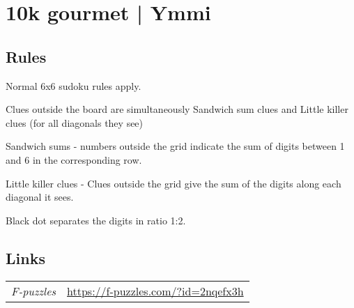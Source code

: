 \section{10k gourmet | {\normalfont Ymmi}}
\label{sec:06-10k-gourmet-ymmi}

\subsection*{Rules}
\begin{markdown}
Normal 6x6 sudoku rules apply. 

Clues outside the board are simultaneously Sandwich sum clues and Little killer clues (for all diagonals they see) 

Sandwich sums - numbers outside the grid indicate the sum of digits between 1 and 6 in the corresponding row\column.

Little killer clues - Clues outside the grid give the sum of the digits along each diagonal it sees. 

Black dot separates the digits in ratio 1:2.
\end{markdown}
\subsection*{Links}
\begin{tabularx}{\textwidth}{l X}
\emph{F-puzzles} & \url{https://f-puzzles.com/?id=2nqefx3h} \\
\end{tabularx}
\pagebreak
